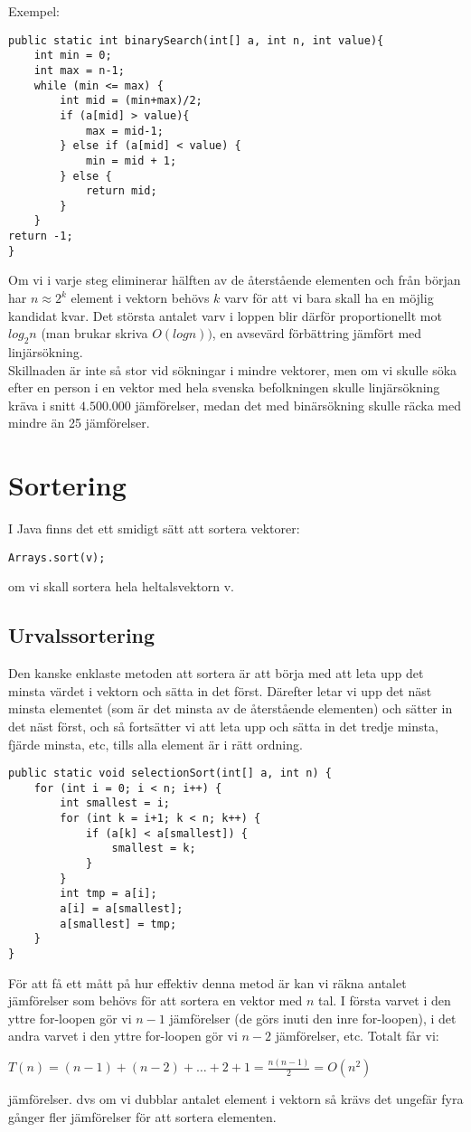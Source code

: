 \documentclass[11pt]{article}
\begin{document}
Exempel:
\begin{lstlisting}
public static int binarySearch(int[] a, int n, int value){
	int min = 0;
	int max = n-1;
	while (min <= max) {
		int mid = (min+max)/2;
		if (a[mid] > value){
			max = mid-1;
		} else if (a[mid] < value) {
			min = mid + 1;
		} else {
			return mid;
		}
	}
return -1;
}
\end{lstlisting}
Om vi i varje steg eliminerar hälften av de återstående elementen och från början har $ n \approx 2^k$ element i vektorn behövs $k$ varv för att vi bara skall ha en möjlig kandidat kvar. Det största antalet varv i loppen blir därför proportionellt mot $log_2 n$ (man brukar skriva $O(log n))$, en avsevärd förbättring jämfört med linjärsökning. \\
Skillnaden är inte så stor vid sökningar i mindre vektorer, men om vi skulle söka efter en person i en vektor med hela svenska befolkningen skulle linjärsökning kräva i snitt $ 4.500.000$ jämförelser, medan det med binärsökning skulle räcka med mindre än 25 jämförelser. 
\section{Sortering}
I Java finns det ett smidigt sätt att sortera vektorer:
\begin{lstlisting}
Arrays.sort(v);
\end{lstlisting}
om vi skall sortera hela heltalsvektorn v. 
\subsection{Urvalssortering}
Den kanske enklaste metoden att sortera är att börja med att leta upp det minsta värdet i vektorn och sätta in det först. Därefter letar vi upp det näst minsta elementet (som är det minsta av de återstående elementen) och sätter in det näst först, och så fortsätter vi att leta upp och sätta in det tredje minsta, fjärde minsta, etc, tills alla element är i rätt ordning. 
\begin{lstlisting}
public static void selectionSort(int[] a, int n) {
	for (int i = 0; i < n; i++) {
		int smallest = i;
		for (int k = i+1; k < n; k++) {
			if (a[k] < a[smallest]) {
				smallest = k;
			}
		}
		int tmp = a[i];
		a[i] = a[smallest];
		a[smallest] = tmp;
	}
}
\end{lstlisting}
För att få ett mått på hur effektiv denna metod är kan vi räkna antalet jämförelser som behövs för att sortera en vektor med $n$ tal. I första varvet i den yttre for-loopen gör vi $ n - 1$ jämförelser (de görs inuti den inre for-loopen), i det andra varvet i den yttre for-loopen gör vi $n - 2$ jämförelser, etc. Totalt får vi: 
\begin{center}
$ T(n) = (n -1) + (n-2) + \dots + 2 + 1 = \frac{n(n-1)}{2} = O(n^2)$
\end{center}
jämförelser. dvs om vi dubblar antalet element i vektorn så krävs det ungefär fyra gånger fler jämförelser för att sortera elementen. 
\end{document}
